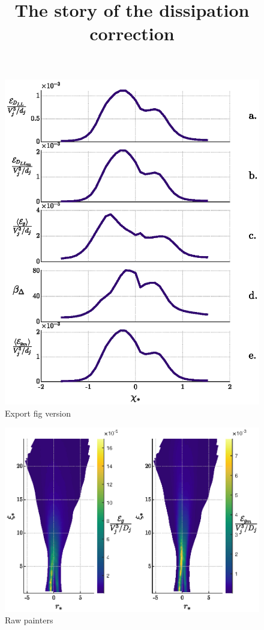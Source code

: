 \documentclass{article}
\title{The story of the dissipation correction}
\date{}
\begin{document}
\maketitle

\begin{figure}
    \centering
    \includegraphics{figs/PG_4Hz_Diss_Splots.eps}
    \caption{Export fig version}
    \label{dissPlots1}
\end{figure}

\begin{figure}
    \centering
    \includegraphics{figs/PG_4Hz_diss_contours.eps}
    \caption{Raw painters}
    \label{conts1}
\end{figure}
\end{document}

